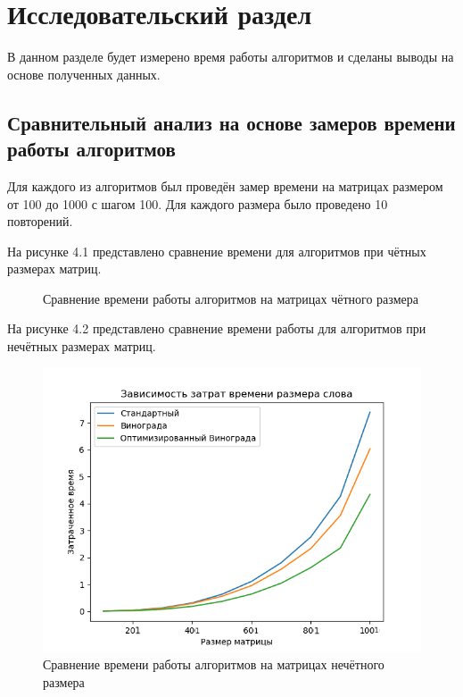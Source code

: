 \chapter{Исследовательский раздел}
\label{cha:research}
В данном разделе будет измерено время работы алгоритмов и сделаны выводы на основе полученных данных.
\section{Сравнительный анализ на основе замеров времени работы алгоритмов}
Для каждого из алгоритмов был проведён замер времени на матрицах размером от 100 до 1000 с шагом 100. Для каждого размера было проведено 10 повторений.
\par На рисунке 4.1 представлено сравнение времени для алгоритмов при чётных размерах матриц.
\begin{figure}
\centering
{}
\caption{Сравнение времени работы алгоритмов на матрицах чётного размера}
\end{figure}

\par На рисунке 4.2 представлено сравнение времени работы для алгоритмов при нечётных размерах матриц.
\begin{figure}[H]
	\centering
	\includegraphics[width=0.7\linewidth]{src/odd}
	\caption{Сравнение времени работы алгоритмов на матрицах нечётного размера}
	\label{fig:odd}
\end{figure}

